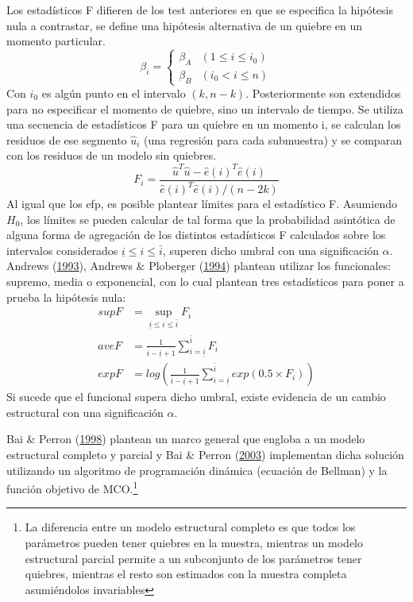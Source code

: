 \documentclass[12pt,oneside]{reedthesis}
\begin{document}
Los estadísticos F difieren de los test anteriores en que se especifica la hipótesis nula a contrastar, se define una hipótesis alternativa de un quiebre en un momento particular.
\begin{equation}
\beta_i = \begin{cases} 
\beta_A &(1 \leq i \leq i_0) \\
\beta_B &(i_0 < i \leq n)
\end{cases}
\end{equation}
Con \(i_0\) es algún punto en el intervalo \((k, n-k)\). Posteriormente son extendidos para no especificar el momento de quiebre, sino un intervalo de tiempo. Se utiliza una secuencia de estadísticos F para un quiebre en un momento i, se calculan los residuos de ese segmento \(\hat{u}_i\) (una regresión para cada submuestra) y se comparan con los residuos de un modelo sin quiebres.
\begin{equation}
F_{i} = \frac{\hat{u}^T\hat{u}-\hat{e}(i)^T\hat{e}(i)} {\hat{e}(i)^T\hat{e}(i)/(n-2k)}
\end{equation}
Al igual que los efp, es posible plantear límites para el estadístico F. Asumiendo \(H_0\), los límites se pueden calcular de tal forma que la probabilidad asintótica de alguna forma de agregación de los distintos estadísticos F calculados sobre los intervalos considerados \(\underline i \leq i \leq \bar{i}\), superen dicho umbral con una significación \(\alpha\). Andrews (\protect\hyperlink{ref-Andrews1993}{1993}), Andrews \& Ploberger (\protect\hyperlink{ref-Andrews1994}{1994}) plantean utilizar los funcionales: supremo, media o exponencial, con lo cual plantean tres estadísticos para poner a prueba la hipótesis nula:
\begin{align}
supF &= \sup_{\underline i \leq i \leq \bar{i}} F_i \\
aveF &= \frac{1}{\bar{i} - \underline i + 1}\sum_{i = \underline i}^{\bar{i}}F_i \\
expF &= log \left( \frac{1}{\bar{i}-\underline i + 1}\sum_{i = \underline i}^{\bar{i}}exp(0.5\times F_i) \right)
\end{align}
Si sucede que el funcional supera dicho umbral, existe evidencia de un cambio estructural con una significación \(\alpha\).

Bai \& Perron (\protect\hyperlink{ref-BaiPerron1998}{1998}) plantean un marco general que engloba a un modelo estructural completo y parcial y Bai \& Perron (\protect\hyperlink{ref-BaiPerron2003}{2003}) implementan dicha solución utilizando un algoritmo de programación dinámica (ecuación de Bellman) y la función objetivo de MCO.\footnote{La diferencia entre un modelo estructural completo es que todos los parámetros pueden tener quiebres en la muestra, mientras un modelo estructural parcial permite a un subconjunto de los parámetros tener quiebres, mientras el resto son estimados con la muestra completa asumiéndolos invariables}
\end{document}
